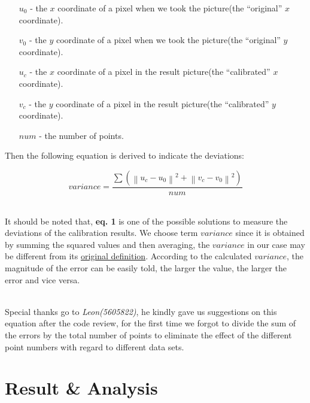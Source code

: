\documentclass[a4paper]{article}
\begin{document}
\begin{itemize}
\item[$u_0$] - the $x$ coordinate of a pixel when we took the picture(the ``original'' $x$ coordinate).
\item[$v_0$] - the $y$ coordinate of a pixel when we took the picture(the ``original'' $y$ coordinate).
\item[$u_c$] - the $x$ coordinate of a pixel in the result picture(the ``calibrated'' $x$ coordinate).
\item[$v_c$] - the $y$ coordinate of a pixel in the result picture(the ``calibrated'' $y$ coordinate).
\item[$num$] - the number of points.
\end{itemize}

Then the following equation is derived to indicate the deviations:

\begin{equation}
    variance = \frac{\sum \left (  \left \| u_c - u_0 \right \|^2 + \left \| v_c - v_0 \right \|^2\right )}{num}
\end{equation}

~\\
It should be noted that, \textbf{eq. 1} is one of the possible solutions to measure the deviations of the calibration results. We choose term $variance$ since it is obtained by summing the squared values and then averaging, the $variance$ in our case may be different from its \href{https://en.wikipedia.org/wiki/Variance}{original definition}. According to the calculated $variance$, the magnitude of the error can be easily told, the larger the value, the larger the error and vice versa.

~\\
Special thanks go to \textit{Leon(5605822)}, he kindly gave us suggestions on this equation after the code review, for the first time we forgot to divide the sum of the errors by the total number of points to eliminate the effect of the different point numbers with regard to different data sets.

\section{Result \& Analysis}
\end{document}
